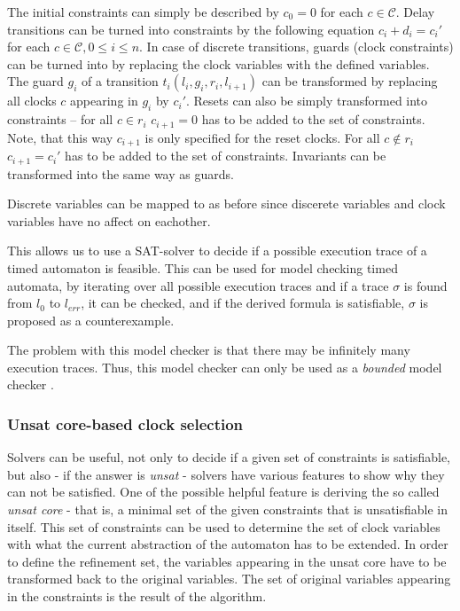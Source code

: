 The initial constraints can simply be described by $c_0 =0$ for each $c \in \mathcal{C}$. Delay transitions can be turned into constraints by the following equation $c_i+d_i=c_i'$ for each $c \in \mathcal{C}, 0 \leq i \leq n$. In case of discrete transitions, guards (clock constraints) can be turned into  by replacing the clock variables with the defined variables. The guard $g_i$ of a transition $t_i(l_i,g_i,r_i,l_{i+1})$ can be transformed by replacing all clocks $c$ appearing in $g_i$ by $c_i'$. Resets can also be simply transformed into constraints -- for all $c \in r_i$ $c_{i+1}=0$ has to be added to the set of constraints. Note, that this way $c_{i+1}$ is only specified for the reset clocks. For all $c \not\in r_i$ $c_{i+1}=c_i'$ has to be added to the set of constraints. Invariants can be transformed into  the same way as guards.

Discrete variables can be mapped to  as before since discerete variables and clock variables have no affect on eachother.


This allows us to use a SAT-solver to decide if a possible execution trace of a timed automaton is feasible. This can be used for model checking timed automata, by iterating over all possible execution traces and if a trace $\sigma$ is found from $l_0$ to $l_{err}$, it can be checked, and if the derived formula is satisfiable, $\sigma$ is proposed as a counterexample. 

The problem with this model checker is that there may be infinitely many execution traces. Thus, this model checker can only be used as a \emph{bounded} model checker .


\subsubsection{Unsat core-based clock selection}

Solvers can be useful, not only to decide if a given set of constraints is satisfiable, but also - if the answer is \emph{unsat} - solvers have various features to show why they can not be satisfied. One of the possible helpful feature is deriving the so called \emph{unsat core} - that is, a minimal set of the given constraints that is unsatisfiable in itself. This set of constraints can be used to determine the set of clock variables with what the current abstraction of the automaton has to be extended. In order to define the refinement set, the variables appearing in the unsat core have to be transformed back to the original variables. The set of original variables appearing in the constraints is the result of the algorithm.

